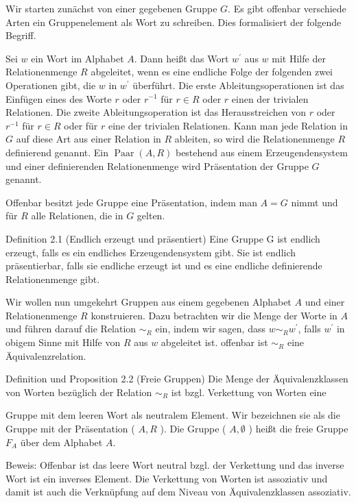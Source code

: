 \documentclass[10pt, letterpaper]{article}
\begin{document}
Wir starten zunächst von einer gegebenen Gruppe $G$. Es gibt offenbar verschiede Arten ein Gruppenelement als Wort zu schreiben. Dies formalisiert der folgende Begriff.

Sei $w$ ein Wort im Alphabet $A$. Dann heißt das Wort $w^{\prime}$ aus $w$ mit Hilfe der Relationenmenge $R$ abgeleitet, wenn es eine endliche Folge der folgenden zwei Operationen gibt, die $w$ in $w^{\prime}$ überführt. Die erste Ableitungsoperationen ist das Einfügen eines des Worte $r$ oder $r^{-1}$ für $r \in R$ oder $r$ einen der trivialen Relationen. Die zweite Ableitungsoperation ist das Herausstreichen von $r$ oder $r^{-1}$ für $r \in R$ oder für $r$ eine der trivialen Relationen. Kann man jede Relation in $G$ auf diese Art aus einer Relation in $R$ ableiten, so wird die Relationenmenge $R$ definierend genannt. Ein $\operatorname{Paar}(A, R)$ bestehend aus einem Erzeugendensystem und einer definierenden Relationenmenge wird Präsentation der Gruppe $G$ genannt.

Offenbar besitzt jede Gruppe eine Präsentation, indem man $A=G$ nimmt und für $R$ alle Relationen, die in $G$ gelten.

Definition 2.1 (Endlich erzeugt und präsentiert) Eine Gruppe G ist endlich erzeugt, falls es ein endliches Erzeugendensystem gibt. Sie ist endlich präsentierbar, falls sie endliche erzeugt ist und es eine endliche definierende Relationenmenge gibt.

Wir wollen nun umgekehrt Gruppen aus einem gegebenen Alphabet $A$ und einer Relationenmenge $R$ konstruieren. Dazu betrachten wir die Menge der Worte in $A$ und führen darauf die Relation $\sim_{R}$ ein, indem wir sagen, dass $w \sim_{R} w^{\prime}$, falls $w^{\prime}$ in obigem Sinne mit Hilfe von $R$ aus $w$ abgeleitet ist. offenbar ist $\sim_{R}$ eine Äquivalenzrelation.

Definition und Proposition 2.2 (Freie Gruppen) Die Menge der Äquivalenzklassen von Worten bezüglich der Relation $\sim_{R}$ ist bzgl. Verkettung von Worten eine

Gruppe mit dem leeren Wort als neutralem Element. Wir bezeichnen sie als die Gruppe mit der Präsentation ( $A, R$ ). Die Gruppe ( $A, \emptyset$ ) heißt die freie Gruppe $F_{A}$ über dem Alphabet $A$.

Beweis: Offenbar ist das leere Wort neutral bzgl. der Verkettung und das inverse Wort ist ein inverses Element. Die Verkettung von Worten ist assoziativ und damit ist auch die Verknüpfung auf dem Niveau von Äquivalenzklassen assoziativ.
\end{document}
